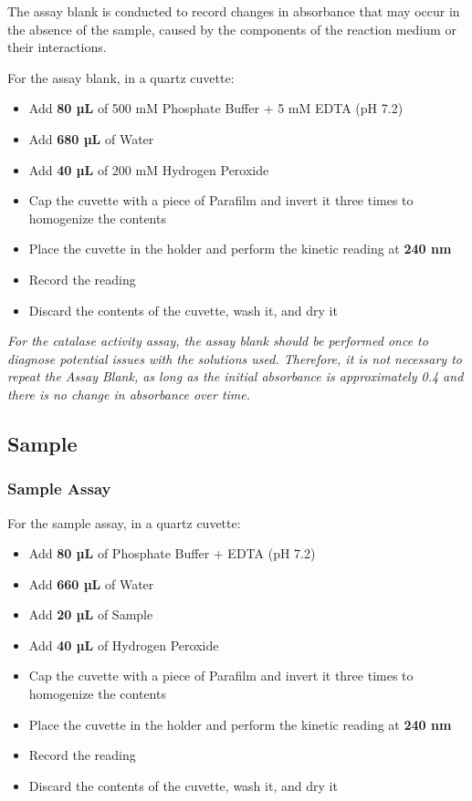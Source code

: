 \documentclass[
  9pt,
  american,
  a5paper,
  extrafontsizes,onecolumn,openright
  ]{memoir}
\providecommand{\tightlist}{%
  \setlength{\itemsep}{0pt}\setlength{\parskip}{0pt}}
\newlength{\rf}
\begin{document}
The assay blank is conducted to record changes in absorbance that may occur in the absence of the sample, caused by the components of the reaction medium or their interactions.

For the assay blank, in a quartz cuvette:

\begin{itemize}
\tightlist
\item
  Add \textbf{80 µL} of 500 mM Phosphate Buffer + 5 mM EDTA (pH 7.2)
\item
  Add \textbf{680 µL} of Water
\item
  Add \textbf{40 µL} of 200 mM Hydrogen Peroxide
\item
  Cap the cuvette with a piece of Parafilm and invert it three times to homogenize the contents
\item
  Place the cuvette in the holder and perform the kinetic reading at \textbf{240 nm}
\item
  Record the reading
\item
  Discard the contents of the cuvette, wash it, and dry it
\end{itemize}

\begin{greybox}[frametitle = Note]
\emph{For the catalase activity assay, the assay blank should be performed once to diagnose potential issues with the solutions used. Therefore, it is not necessary to repeat the Assay Blank, as long as the initial absorbance is approximately 0.4 and there is no change in absorbance over time.}

\end{greybox}

\subsection{Sample}\label{sample}

\subsubsection{Sample Assay}\label{cat_smp_assay}

For the sample assay, in a quartz cuvette:

\begin{itemize}
\tightlist
\item
  Add \textbf{80 µL} of Phosphate Buffer + EDTA (pH 7.2)
\item
  Add \textbf{660 µL} of Water
\item
  Add \textbf{20 µL} of Sample
\item
  Add \textbf{40 µL} of Hydrogen Peroxide
\item
  Cap the cuvette with a piece of Parafilm and invert it three times to homogenize the contents
\item
  Place the cuvette in the holder and perform the kinetic reading at \textbf{240 nm}
\item
  Record the reading
\item
  Discard the contents of the cuvette, wash it, and dry it
\end{itemize}
\end{document}
